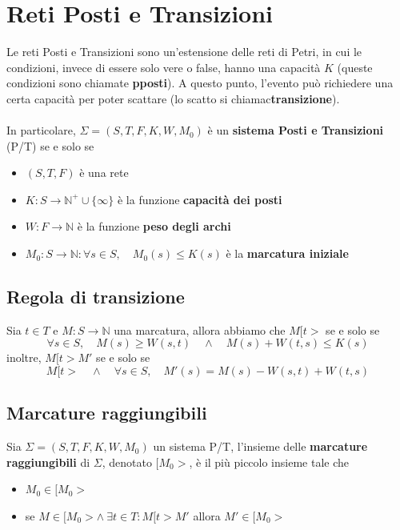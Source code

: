 \section{Reti Posti e Transizioni}

Le reti Posti e Transizioni sono un'estensione delle reti di Petri, in cui le condizioni, invece di essere solo vere o false, hanno una capacità $K$ (queste condizioni sono chiamate \textbf{pposti}).
A questo punto, l'evento può richiedere una certa capacità per poter scattare (lo scatto si chiamac\textbf{transizione}).
\\
\\
In particolare, $\Sigma = (S, T, F, K, W, M_0)$ è un \textbf{sistema Posti e Transizioni} (P/T) se e solo se

\begin{itemize}
	\item $(S, T, F)$ è una rete
	\item $K : S \to \mathbb N^+ \cup \{ \infty \}$ è la funzione \textbf{capacità dei posti}

	\item $W : F \to \mathbb N$ è la funzione \textbf{peso degli archi}

	\item $M_0 : S \to \mathbb N : \forall s \in S, \quad M_0(s) \leq K(s)$ è la \textbf{marcatura iniziale}
\end{itemize}

\subsection{Regola di transizione}

Sia $t \in T$ e $M : S \to \mathbb N$ una marcatura, allora abbiamo che $M[t>$ se e solo se
\[
	\forall s \in S, \quad
	M(s) \geq W(s, t) \quad \wedge \quad M(s) + W(t, s) \leq K(s)
\]
inoltre, $M[t>M'$ se e solo se
\[
	M[t>
	\quad \wedge \quad
	\forall s \in S,
	\quad
	M'(s) = M(s) - W(s, t) + W(t, s)
\]

\subsection{Marcature raggiungibili}

Sia $\Sigma = (S, T, F, K, W, M_0)$ un sistema P/T, l'insieme delle \textbf{marcature raggiungibili} di $\Sigma$, denotato $[M_0>$, è il più piccolo insieme tale che
\begin{itemize}
	\item $M_0 \in [M_0>$
	\item se $M \in [M_0> \wedge \ \exists t \in T : M[t>M'$ allora $M' \in [M_0>$
\end{itemize}

